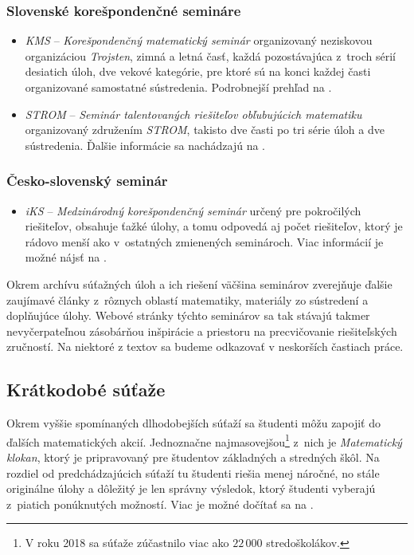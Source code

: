 \subsubsection{Slovenské korešpondenčné semináre}
\begin{itemize}
\item \textit{KMS} -- \textit{Korešpondenčný matematický seminár} organizovaný neziskovou organizáciou \textit{Trojsten}, zimná a letná časť, každá pozostávajúca z~troch sérií desiatich úloh, dve vekové kategórie, pre ktoré sú na konci každej časti organizované samostatné sústredenia. Podrobnejší prehľad na \cite{kms}.
\item \textit{STROM} -- \textit{Seminár talentovaných riešiteľov obľubujúcich matematiku} organizovaný združením \textit{STROM}, takisto dve časti po tri série úloh a dve sústredenia. Ďalšie informácie sa nachádzajú na \cite{strom}.
\end{itemize}

\subsubsection*{Česko-slovenský seminár}
\begin{itemize}
\item \textit{iKS} -- \textit{Medzinárodný korešpondenčný seminár} určený pre pokročilých riešiteľov, obsahuje ťažké úlohy, a tomu odpovedá aj počet riešiteľov, ktorý je rádovo menší ako v~ostatných zmienených seminároch. Viac informácií je možné nájsť na \cite{iKS}.
\end{itemize}

Okrem archívu súťažných úloh a ich riešení väčšina seminárov zverejňuje ďalšie zaujímavé články z~rôznych oblastí matematiky, materiály zo sústredení a doplňujúce úlohy. Webové stránky týchto seminárov sa tak stávajú takmer nevyčerpateľnou zásobárňou inšpirácie a priestoru na precvičovanie riešiteľských zručností. Na niektoré z textov sa budeme odkazovať v neskorších častiach práce.


\subsection*{Krátkodobé súťaže}

Okrem vyššie spomínaných dlhodobejších súťaží sa študenti môžu zapojiť do ďalších matematických akcií. Jednoznačne najmasovejšou\footnote{V roku 2018 sa súťaže zúčastnilo viac ako $22\,000$ stredoškolákov.} z~nich je \textit{Matematický klokan}, ktorý je pripravovaný pre študentov základných a stredných škôl. Na rozdiel od predchádzajúcich súťaží tu študenti riešia menej náročné, no stále originálne úlohy a dôležitý je len správny výsledok, ktorý študenti vyberajú z~piatich ponúknutých možností. Viac je možné dočítať sa na \cite{MK}.


